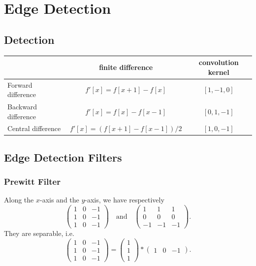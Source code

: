 \documentclass[twocolumn,landscape,10pt]{article}
\theoremstyle{definition}
\begin{document}
\section{Edge Detection}

\subsection{Detection}

\begin{table}[h]
    \centering
    \begin{tabular}{l|c|c}
          & finite difference & convolution kernel \\
        \hline
        Forward difference & $f'[x]=f[x+1]-f[x]$ & $[1,-1,0]$ \\
        \hline
        Backward difference & $f'[x]=f[x]-f[x-1]$ & $[0,1,-1]$ \\
        \hline
        Central difference & $f'[x]=(f[x+1]-f[x-1])/2$ & $[1,0,-1]$
    \end{tabular} 
\end{table} 

\subsection{Edge Detection Filters}

\subsubsection{Prewitt Filter}

Along the $x$-axis and the $y$-axis, we have respectively
\[
    \begin{pmatrix}
        1 & 0 & -1 \\
        1 & 0 & -1 \\
        1 & 0 & -1
    \end{pmatrix} 
    \quad\text{and}\quad
    \begin{pmatrix}
        1 & 1 & 1 \\
        0 & 0 & 0 \\
        -1 & -1 & -1
    \end{pmatrix}.
\]
They are separable, i.e.\
\[
    \begin{pmatrix}
        1 & 0 & -1 \\
        1 & 0 & -1 \\
        1 & 0 & -1
    \end{pmatrix} 
    =
    \begin{pmatrix}
        1 \\
        1 \\
        1
    \end{pmatrix} 
    *
    \begin{pmatrix}
        1 & 0 & -1
    \end{pmatrix}.
\]
\end{document}
